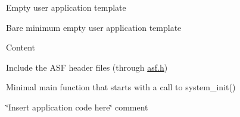 \begin{DoxyParagraph}{Empty user application template}

\end{DoxyParagraph}
Bare minimum empty user application template

\begin{DoxyParagraph}{Content}

\end{DoxyParagraph}

\begin{DoxyEnumerate}
\item Include the A\+SF header files (through \mbox{\hyperlink{asf_8h}{asf.\+h}})
\item Minimal main function that starts with a call to system\+\_\+init()
\item \char`\"{}\+Insert application code here\char`\"{} comment 
\end{DoxyEnumerate}